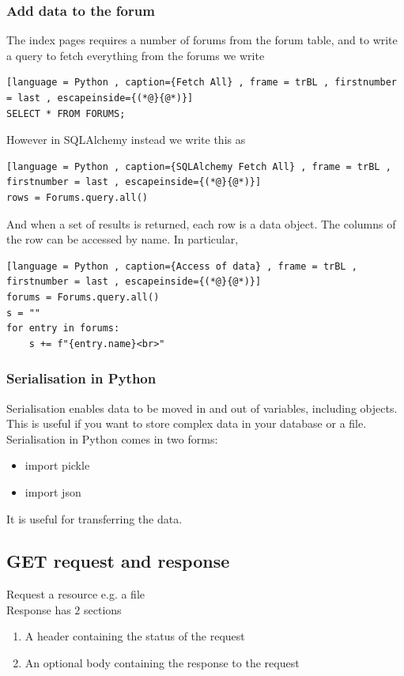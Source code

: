 \documentclass[a4paper]{article}
\theoremstyle{plain}
\theoremstyle{definition}
\theoremstyle{remark}
\begin{document}
\begin{flushleft}
\subsubsection{Add data to the forum}
The index pages requires a number of forums from the forum table, and to write a query to fetch everything from the forums we write
\begin{lstlisting}[language = Python , caption={Fetch All} , frame = trBL , firstnumber = last , escapeinside={(*@}{@*)}]
SELECT * FROM FORUMS;
\end{lstlisting}
However in SQLAlchemy instead we write this as
\begin{lstlisting}[language = Python , caption={SQLAlchemy Fetch All} , frame = trBL , firstnumber = last , escapeinside={(*@}{@*)}]
rows = Forums.query.all()
\end{lstlisting}
And when a set of results is returned, each row is a data object. The columns of the row can be accessed by name. In particular,
\begin{lstlisting}[language = Python , caption={Access of data} , frame = trBL , firstnumber = last , escapeinside={(*@}{@*)}]
forums = Forums.query.all()
s = ""
for entry in forums:
	s += f"{entry.name}<br>"
\end{lstlisting}
\subsubsection{Serialisation in Python}
Serialisation enables data to be moved in and out of variables, including objects. This is useful if you want to store complex data in your database or a file. Serialisation in Python comes in two forms:
\begin{itemize}
	\item import pickle
	\item import json
\end{itemize}
It is useful for transferring the data.
\subsection{GET request and response}
Request a resource e.g. a file \\
Response has $2$ sections
\begin{enumerate}
	\item A header containing the status of the request
	\item An optional body containing the response to the request
\end{enumerate}

\end{flushleft}
\end{document}
